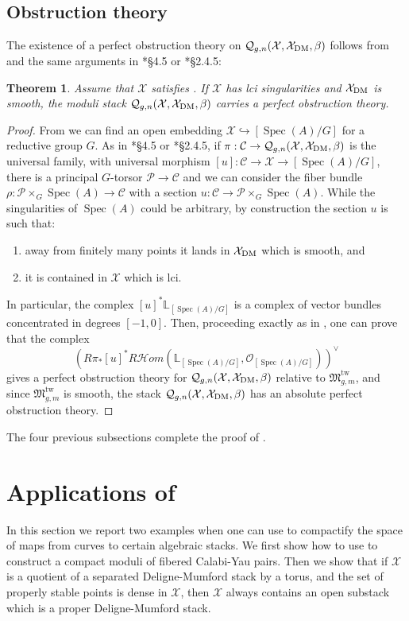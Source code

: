 \documentclass{amsart}
\newcommand{\bL}{\mathbb{L}}
\newcommand{\cC}{\mathcal{C}}
\newcommand{\cH}{\mathcal{H}}
\newcommand{\cO}{\mathcal{O}}
\newcommand{\cP}{\mathcal{P}}
\newcommand{\cQ}{\mathcal{Q}}
\newcommand{\cX}{\mathcal{X}}
\newcommand{\spec}{\operatorname{Spec}}
\newcommand{\dm}{{\rm DM}}
\newtheorem{Teo}[theorem]{Theorem}
\theoremstyle{definition}
\theoremstyle{definition}
\begin{document}
{    \subsection{Obstruction theory}\label{subsection_obstruction_theory}
The existence of a perfect obstruction theory on $\cQ_{g,n}(\cX,\cX_\dm,\beta)$ follows from  and the same arguments in \cite{ciocan2014stable}*{\S 4.5} or \cite{orbifold_qmap_theory}*{\S 2.4.5}:
\begin{Teo}
    Assume that $\cX$ satisfies . If $\cX$ has lci singularities and $\cX_\dm$ is smooth, the moduli stack $\cQ_{g,n}(\cX,\cX_\dm,\beta)$ carries a perfect obstruction theory.
\end{Teo}
\begin{proof}
From  we can find an open embedding $\cX\hookrightarrow [\spec(A)/G]$ for a reductive group $G$. As in \cite{ciocan2014stable}*{\S 4.5} or \cite{orbifold_qmap_theory}*{\S 2.4.5}, if $\pi:\cC\to \cQ_{g,n}(\cX,\cX_\dm,\beta)$ is the universal family, with universal morphism $[u]:\cC\to \cX\to [\spec(A)/G]$, there is a principal $G$-torsor $\cP\to \cC$ and we can consider the fiber bundle $\rho:\cP\times_G\spec(A)\to \cC$ with a section $u:\cC\to \cP\times_G\spec(A)$. While the singularities of $\spec(A)$ could be arbitrary, by construction the section $u$ is such that:
\begin{enumerate}
    \item away from finitely many points it lands in $\cX_\dm$ which is smooth, and
    \item it is contained in $\cX$ which is lci.
\end{enumerate}
In particular, the complex $[u]^*\bL_{[\spec(A)/G]}$ is a complex of vector bundles concentrated in degrees $[-1,0]$. Then, proceeding exactly as in \cite{orbifold_qmap_theory}, one can prove that the complex \[
(R\pi_*[u]^*R\cH om(\bL_{[\spec(A)/G]},\cO_{[\spec(A)/G]}))^\vee
\]
 gives a perfect obstruction theory for $\cQ_{g,n}(\cX,\cX_\dm,\beta)$ relative to $\mathfrak{M}^{\operatorname{tw}}_{g,m}$, and since $\mathfrak{M}^{\operatorname{tw}}_{g,m}$ is smooth, the stack $\cQ_{g,n}(\cX,\cX_\dm,\beta)$ has an absolute perfect obstruction theory.
 \end{proof}
 The four previous subsections complete the proof of .

\section{Applications of }\label{section_examples_qmaps}
In this section we report two examples when one can use  to compactify the space of maps from curves to certain algebraic stacks. We first show how to use  to construct a compact moduli of fibered Calabi-Yau pairs. Then we show that if $\cX$ is a quotient of a separated Deligne-Mumford stack by a torus, and the set of properly stable points is dense in $\cX$, then $\cX$ always contains an open substack which is a proper Deligne-Mumford stack.

}
\end{document}
